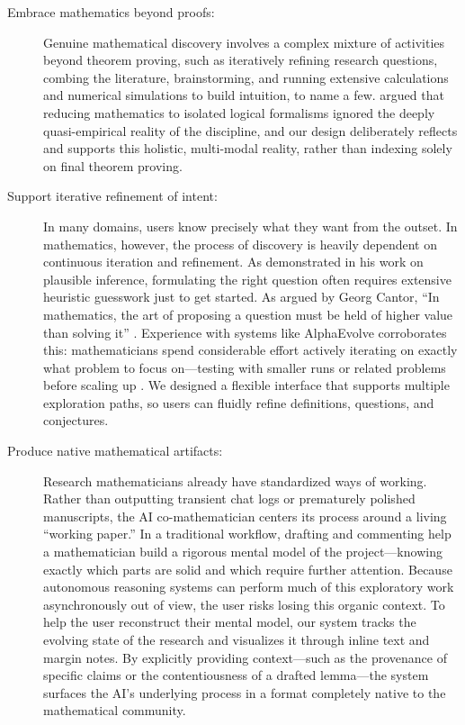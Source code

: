 \documentclass[11pt, a4paper, copyright, gdm]{google}
\begin{document}
\begin{description}
    
\item[Embrace mathematics beyond proofs:] Genuine mathematical discovery involves a complex mixture of activities beyond theorem proving, such as iteratively refining research questions, combing the literature, brainstorming, and running extensive calculations and numerical simulations to build intuition, to name a few.
\citet{putnam1975} argued that reducing mathematics to isolated logical formalisms ignored the deeply quasi-empirical reality of the discipline, and our design deliberately reflects and supports this holistic, multi-modal reality, rather than indexing solely on final theorem proving.

\item[Support iterative refinement of intent:] In many domains, users know precisely what they want from the outset.
In mathematics, however, the process of discovery is heavily dependent on continuous iteration and refinement.
As \citet{polya1954} demonstrated in his work on plausible inference, formulating the right question often requires extensive heuristic guesswork just to get started.
As argued by Georg Cantor, ``In mathematics, the art of proposing a question must be held of higher value than solving it'' \citep[p.~27]{dauben1979}.
Experience with systems like AlphaEvolve corroborates this: mathematicians spend considerable effort actively iterating on exactly what problem to focus on---testing with smaller runs or related problems before scaling up \citep{romeraparedes2024, novikov2025}.
We designed a flexible interface that supports  multiple exploration paths, so users can fluidly refine definitions, questions, and conjectures.

\item[Produce native mathematical artifacts:] Research mathematicians already have standardized ways of working.
Rather than outputting transient chat logs or prematurely polished manuscripts, the AI co-mathematician centers its process around a living ``working paper.''
In a traditional workflow, drafting and commenting help a mathematician build a rigorous mental model of the project---knowing exactly which parts are solid and which require further attention.
Because autonomous reasoning systems can perform much of this exploratory work asynchronously out of view, the user risks losing this organic context.
To help the user reconstruct their mental model, our system tracks the evolving state of the research and visualizes it through inline text and margin notes.
By explicitly providing context---such as the provenance of specific claims or the contentiousness of a drafted lemma---the system surfaces the AI's underlying process in a format completely native to the mathematical community.


\end{description}
\end{document}
